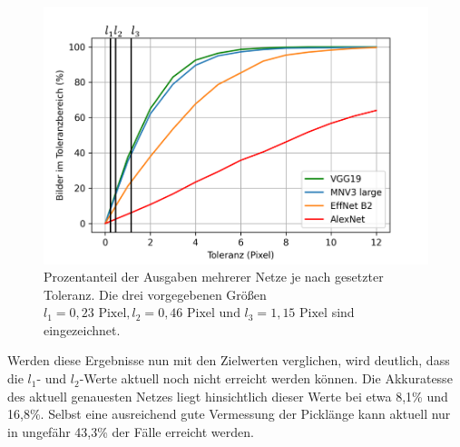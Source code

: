 \begin{figure}[h!]
\centering
\includegraphics[width=14cm]{98_images/abweichungen_nach_toleranz.png}
\caption{Prozentanteil der Ausgaben mehrerer Netze je nach gesetzter Toleranz. Die drei vorgegebenen Größen $l_1 = 0,23 \text{ Pixel}, l_2 = 0,46 \text{ Pixel und } l_3 = 1,15 \text{ Pixel}$ sind eingezeichnet.}
\label{fig:abweichungen-je-toleranz}
\end{figure}

\mypar Werden diese Ergebnisse nun mit den Zielwerten verglichen, wird deutlich, dass die $l_1$- und $l_2$-Werte aktuell noch nicht erreicht werden können. Die Ak­ku­ra­tes­se des aktuell genauesten Netzes liegt hinsichtlich dieser Werte bei etwa 8,1{\%} und 16,8{\%}. Selbst eine ausreichend gute Vermessung der Picklänge kann aktuell nur in ungefähr 43,3{\%} der Fälle erreicht werden.



